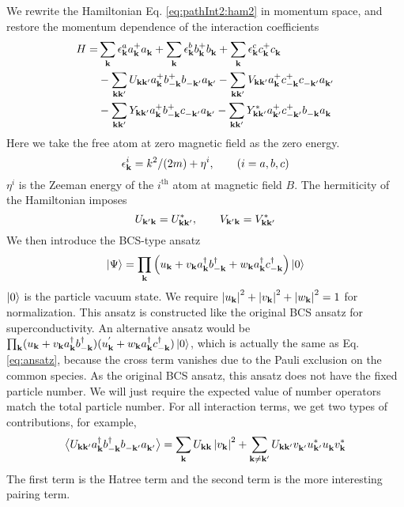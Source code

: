 We rewrite the Hamiltonian Eq. \ref{eq:pathInt2:ham2} in momentum space, and restore the momentum dependence of the interaction coefficients
\begin{equation}\label{eq:uvw:hamiltonian}
\begin{split}
 H=&\sum_{\mathbf{k}}\epsilon^a_{\mathbf{k}}{}a^+_{\mathbf{k}}{}a^{}_{\mathbf{k}}+\sum_{\mathbf{k}}\epsilon^b_{\mathbf{k}}{}b^+_{\mathbf{k}}{}b^{}_{\mathbf{k}}+\sum_{\mathbf{k}}\epsilon^c_{\mathbf{k}}{}c^+_{\mathbf{k}}{}c^{}_{\mathbf{k}}\\
  &-\sum_{\mathbf{k}\mathbf{k}'}U_{\mathbf{k}\mathbf{k}'}a^+_{\mathbf{k}}{}b^+_{-\mathbf{k}}{}b^{}_{-\mathbf{k}'}a^{}_{\mathbf{k}'}
	-\sum_{\mathbf{k}\mathbf{k}'}V_{\mathbf{k}\mathbf{k}'}a^+_{\mathbf{k}}{}c^+_{-\mathbf{k}}{}c^{}_{-\mathbf{k}'}a^{}_{\mathbf{k}'}\\
 &-\sum_{\mathbf{k}\mathbf{k}'}Y_{\mathbf{k}\mathbf{k}'}a^+_{\mathbf{k}}{}b^+_{-\mathbf{k}}{}c^{}_{-\mathbf{k}'}a^{}_{\mathbf{k}'}
	-\sum_{\mathbf{k}\mathbf{k}'}Y^*_{\mathbf{k}\mathbf{k}'}a^+_{\mathbf{k}'}{}c^+_{-\mathbf{k}'}{}b^{}_{-\mathbf{k}}a^{}_{\mathbf{k}}
\end{split} 
\end{equation}
Here we take the free atom at zero magnetic field as the  zero energy.  
\begin{equation*}
\epsilon_{\mathbf{k}}^i=k^2/(2m)+\eta^i, \qquad (i=a,b,c)
\end{equation*}
 $\eta^i$ is the Zeeman energy of the $i^{\text{th}}$ atom at magnetic field $B$. The hermiticity  of the Hamiltonian imposes
 \begin{equation}
 U_{\mathbf{k}'\mathbf{k}}=U^*_{\mathbf{k}\mathbf{k}'},\qquad{} V_{\mathbf{k}'\mathbf{k}}=V^*_{\mathbf{k}\mathbf{k}'}
\end{equation}
  We then introduce the BCS-type ansatz 
\begin{equation}\label{eq:ansatz}
 \left|\Psi\right>=\prod_{\mathbf{k}}\left(u_{\mathbf{k}}+v_{\mathbf{k}}{}a^{\dagger}_{\mathbf{k}}{}b^{\dagger}_{-\mathbf{k}}+w_{\mathbf{k}}{}a^{\dagger}_{\mathbf{k}}{}c^{\dagger}_{-\mathbf{k}}\right)\left|0\right>
\end{equation}
$\left|0\right>$ is the particle vacuum state.  We require $\left\lvert{u_{\ensuremath{\mathbf{k}}}}\right\rvert^2+\left\lvert{v_{\ensuremath{\mathbf{k}}}}\right\rvert^2+\left\lvert{w_{\ensuremath{\mathbf{k}}}}\right\rvert^2=1$ for normalization.  This ansatz is constructed like the original BCS ansatz for superconductivity.  An alternative ansatz would be $\prod_{\mathbf{k}}(u_{\mathbf{k}}+v_{\mathbf{k}}{}a^{\dagger}_{\mathbf{k}}{}b^{\dagger}_{-\mathbf{k}})(u^{'}_{\mathbf{k}}+w_{\mathbf{k}}{}a^{\dagger}_{\mathbf{k}}{}c^{\dagger}_{-\mathbf{k}})\left|0\right>$, which is actually the same as Eq. \ref{eq:ansatz}, because  the cross term vanishes due to the Pauli exclusion on the common species.   As the original BCS ansatz, this ansatz does not have the fixed particle number.  We  will just require the expected value of number operators match the total particle number. For all  interaction terms, we get  two types of contributions,
for example, 
\begin{equation*}
\bigl<{U_{\mathbf{k}\mathbf{k}'}a^{\dagger}_{\mathbf{k}}{}b^{\dagger}_{-\mathbf{k}}{}b^{}_{-\mathbf{k}'}a^{}_{\mathbf{k}'}}\bigr>
=\sum_{\mathbf{k}}U_{\mathbf{k}\mathbf{k}}\left\lvert{v_{\ensuremath{\mathbf{k}}}}\right\rvert^2+\sum_{\mathbf{k}\neq\mathbf{k}'}U_{\mathbf{k}\mathbf{k}'}v^{}_{\mathbf{k}'}u^*_{\mathbf{k}'}u^{}_{\mathbf{k}}{}v^*_{\mathbf{k}}
\end{equation*}
The first term is the Hatree term and the second term is the more interesting pairing term.  


